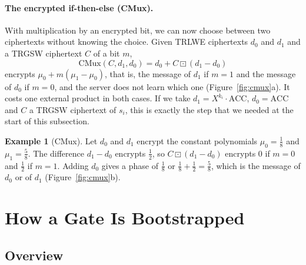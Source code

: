 \documentclass[12pt]{article}
\theoremstyle{plain}
\theoremstyle{definition}
\newtheorem{example}{Example}
\newcommand{\ext}{\boxdot}
\begin{document}
\paragraph{The encrypted if-then-else (CMux).}
With multiplication by an encrypted bit, we can now choose between two
ciphertexts without knowing the choice. Given TRLWE ciphertexts $d_0$ and $d_1$
and a TRGSW ciphertext $C$ of a bit $m$,
\begin{equation}
  \mathrm{CMux}(C,d_1,d_0)=d_0+C\ext(d_1-d_0)
  \label{eq:cmux}
\end{equation}
encrypts $\mu_0+m(\mu_1-\mu_0)$, that is, the message of $d_1$ if $m=1$ and the
message of $d_0$ if $m=0$, and the server does not learn which one
(Figure~\ref{fig:cmux}a). It costs one external product in both cases. If we
take $d_1=X^{k_i}\cdot\mathrm{ACC}$, $d_0=\mathrm{ACC}$ and $C$ a TRGSW
ciphertext of $s_i$, this is exactly the step that we needed at the start of
this subsection.

\begin{example}[CMux]
\label{ex:cmux}
Let $d_0$ and $d_1$ encrypt the constant polynomials $\mu_0=\frac18$ and
$\mu_1=\frac58$. The difference $d_1-d_0$ encrypts $\frac12$, so $C\ext(d_1-d_0)$
encrypts $0$ if $m=0$ and $\frac12$ if $m=1$. Adding $d_0$ gives a phase of
$\frac18$ or $\frac18+\frac12=\frac58$, which is the message of $d_0$ or of $d_1$
(Figure~\ref{fig:cmux}b).
\end{example}



\section{How a Gate Is Bootstrapped}
\label{sec:bootstrapping}

\subsection{Overview}
\end{document}
